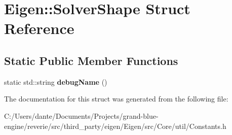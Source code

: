\hypertarget{struct_eigen_1_1_solver_shape}{}\section{Eigen\+::Solver\+Shape Struct Reference}
\label{struct_eigen_1_1_solver_shape}
\subsection*{Static Public Member Functions}
\begin{DoxyCompactItemize}
\item 
\mbox{\label{struct_eigen_1_1_solver_shape_acd3248dd8fe855f8836b6a1f8e930303}} 
static std\+::string {\bfseries debug\+Name} ()
\end{DoxyCompactItemize}


The documentation for this struct was generated from the following file\+:\begin{DoxyCompactItemize}
\item 
C\+:/\+Users/dante/\+Documents/\+Projects/grand-\/blue-\/engine/reverie/src/third\+\_\+party/eigen/\+Eigen/src/\+Core/util/Constants.\+h\end{DoxyCompactItemize}
